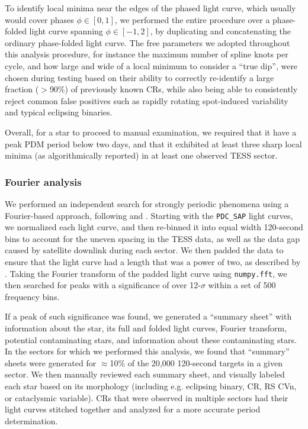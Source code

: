 \documentclass[11pt,twocolumn,tighten]{aastex63}
\begin{document}
To identify local minima near the edges of the phased light curve,
which usually would cover phases $\phi \in [ 0,1 ]$, we performed the
entire procedure over a phase-folded light curve spanning $\phi \in
[-1,2 ]$, by duplicating and concatenating the ordinary phase-folded
light curve.  The free parameters we adopted throughout this analysis
procedure, for instance the maximum number of spline knots per cycle,
and how large and wide of a local minimum to consider a ``true dip'',
were chosen during testing based on their ability to correctly
re-identify a large fraction ($>$90\%) of previously known CRs, while also being
able to consistently reject common false positives such as rapidly
rotating spot-induced variability and typical eclipsing binaries.

Overall, for a star to proceed to manual examination, we required that
it have a peak PDM period below two days, and that it exhibited at
least three sharp local minima (as algorithmically reported) in at
least one observed TESS sector.



\subsubsection{Fourier analysis}
\label{subsec:fourier}

We performed an independent search for strongly periodic phenomena
using a Fourier-based approach, following \citet{2019ApJ...876..127Z}
and \citet[][their Section~1.3]{2023MNRAS.524.4220P}.  Starting with
the {\tt PDC\_SAP} light curves, we normalized each light curve, and
then re-binned it into equal width 120-second bins to account for the
uneven spacing in the TESS data, as well as the data gap caused by
satellite downlink during each sector.  We then padded the data to
ensure that the light curve had a length that was a power of two, as
described by \citeauthor{2019ApJ...876..127Z}.  Taking the Fourier
transform of the padded light curve using {\tt numpy.fft},
we then searched for peaks with a significance of over 12-$\sigma$
within a set of 500 frequency bins. 

If a peak of such significance was found, we generated a ``summary
sheet'' with information about the star, its full and folded light
curves, Fourier transform, potential contaminating stars, and
information about these contaminating stars.  In the sectors for which
we performed this analysis, we found that ``summary'' sheets were
generated for $\approx$10\% of the 20{,}000 120-second targets in a
given sector.  We then manually reviewed each summary sheet, and
visually labeled each star based on its morphology (including e.g.
eclipsing binary, CR, RS CVn, or cataclysmic variable).  CRs that
were observed in multiple sectors had their light curves stitched
together and analyzed for a more accurate period determination.
\end{document}
